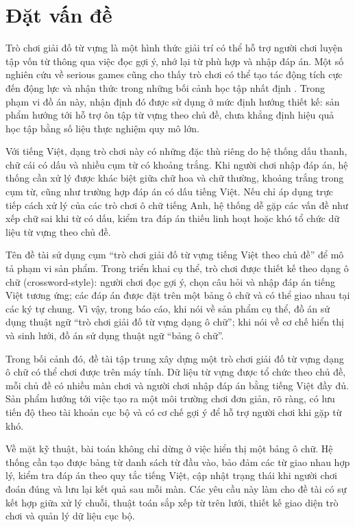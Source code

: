 \documentclass[../DoAn.tex]{subfiles}
\begin{document}
\section{Đặt vấn đề}
\label{section:1.1}
Trò chơi giải đố từ vựng là một hình thức giải trí có thể hỗ trợ người chơi luyện tập vốn từ thông qua việc đọc gợi ý, nhớ lại từ phù hợp và nhập đáp án. Một số nghiên cứu về serious games cũng cho thấy trò chơi có thể tạo tác động tích cực đến động lực và nhận thức trong những bối cảnh học tập nhất định \cite{wouters2013seriousgames}. Trong phạm vi đồ án này, nhận định đó được sử dụng ở mức định hướng thiết kế: sản phẩm hướng tới hỗ trợ ôn tập từ vựng theo chủ đề, chưa khẳng định hiệu quả học tập bằng số liệu thực nghiệm quy mô lớn.

Với tiếng Việt, dạng trò chơi này có những đặc thù riêng do hệ thống dấu thanh, chữ cái có dấu và nhiều cụm từ có khoảng trắng. Khi người chơi nhập đáp án, hệ thống cần xử lý được khác biệt giữa chữ hoa và chữ thường, khoảng trắng trong cụm từ, cũng như trường hợp đáp án có dấu tiếng Việt. Nếu chỉ áp dụng trực tiếp cách xử lý của các trò chơi ô chữ tiếng Anh, hệ thống dễ gặp các vấn đề như xếp chữ sai khi từ có dấu, kiểm tra đáp án thiếu linh hoạt hoặc khó tổ chức dữ liệu từ vựng theo chủ đề.

Tên đề tài sử dụng cụm ``trò chơi giải đố từ vựng tiếng Việt theo chủ đề'' để mô tả phạm vi sản phẩm. Trong triển khai cụ thể, trò chơi được thiết kế theo dạng ô chữ (crossword-style): người chơi đọc gợi ý, chọn câu hỏi và nhập đáp án tiếng Việt tương ứng; các đáp án được đặt trên một bảng ô chữ và có thể giao nhau tại các ký tự chung. Vì vậy, trong báo cáo, khi nói về sản phẩm cụ thể, đồ án sử dụng thuật ngữ ``trò chơi giải đố từ vựng dạng ô chữ''; khi nói về cơ chế hiển thị và sinh lưới, đồ án sử dụng thuật ngữ ``bảng ô chữ''.

Trong bối cảnh đó, đề tài tập trung xây dựng một trò chơi giải đố từ vựng dạng ô chữ có thể chơi được trên máy tính. Dữ liệu từ vựng được tổ chức theo chủ đề, mỗi chủ đề có nhiều màn chơi và người chơi nhập đáp án bằng tiếng Việt đầy đủ. Sản phẩm hướng tới việc tạo ra một môi trường chơi đơn giản, rõ ràng, có lưu tiến độ theo tài khoản cục bộ và có cơ chế gợi ý để hỗ trợ người chơi khi gặp từ khó.

Về mặt kỹ thuật, bài toán không chỉ dừng ở việc hiển thị một bảng ô chữ. Hệ thống cần tạo được bảng từ danh sách từ đầu vào, bảo đảm các từ giao nhau hợp lý, kiểm tra đáp án theo quy tắc tiếng Việt, cập nhật trạng thái khi người chơi đoán đúng và lưu lại kết quả sau mỗi màn. Các yêu cầu này làm cho đề tài có sự kết hợp giữa xử lý chuỗi, thuật toán sắp xếp từ trên lưới, thiết kế giao diện trò chơi và quản lý dữ liệu cục bộ.
\end{document}

